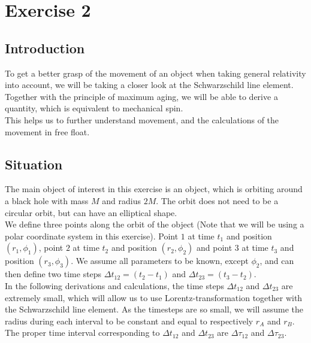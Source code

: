 \documentclass[reprint,english,notitlepage]{revtex4-2}
\begin{document}
\section{Exercise 2}\label{sec:exercise-2}
    \subsection{Introduction}\label{subsec:introduction2}
        To get a better grasp of the movement of an object when taking general relativity into account, we will be taking a closer look at the Schwarzschild line element.
        Together with the principle of maximum aging, we will be able to derive a quantity, which is equivalent to mechanical spin.\\
        This helps us to further understand movement, and the calculations of the movement in free float.

    \subsection{Situation}\label{subsec:situation2}
        The main object of interest in this exercise is an object, which is orbiting around a black hole with mass $M$ and radius $2M$.
        The orbit does not need to be a circular orbit, but can have an elliptical shape.\\
        We define three points along the orbit of the object (Note that we will be using a polar coordinate system in this exercise).
        Point $1$ at time $t_1$ and position $(r_1, \phi_1)$, point $2$ at time $t_2$ and position $(r_2, \phi_2)$ and point $3$ at time $t_3$ and position $(r_3, \phi_3)$.
        We assume all parameters to be known, except $\phi_2$, and can then define two time steps $\Delta t_{12} = (t_2-t_1)$ and $\Delta t_{23} = (t_3-t_2)$.\\

        In the following derivations and calculations, the time steps $\Delta t_{12}$ and $\Delta t_{23}$ are extremely small, which will allow us to use Lorentz-transformation together with the Schwarzschild line element.
        As the timesteps are so small, we will assume the radius during each interval to be constant and equal to respectively $r_A$ and $r_B$.\\

        The proper time interval corresponding to $\Delta t_{12}$ and $\Delta t_{23}$ are $\Delta\tau_{12}$ and $\Delta\tau_{23}$.
\end{document}
